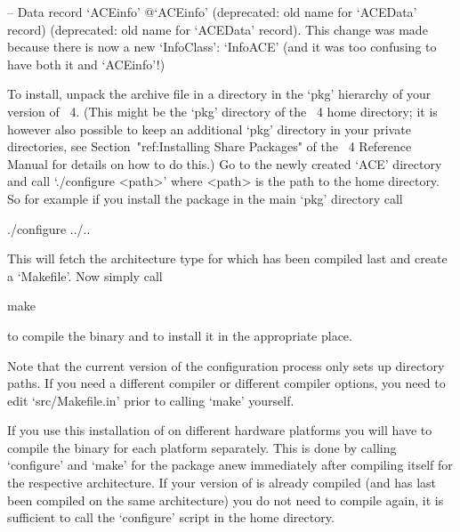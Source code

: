 \item{--} Data      record      `ACEinfo'{\undoquotes{}
{@`ACEinfo' (deprecated: old name for `ACEData' record)}} (deprecated:
old name for `ACEData' record). This change was made because there  is
now a new `InfoClass': `InfoACE' (and it was  too  confusing  to  have
both it and `ACEinfo'!)

\endlist



To  install, unpack  the  archive file  in  a directory  in the  `pkg'
hierarchy  of your  version  of  {\GAP}~4. (This  might  be the  `pkg'
directory of the {\GAP}~4 home  directory; it is however also possible
to keep an additional `pkg' directory in your private directories, see
Section~"ref:Installing  Share Packages"  of  the {\GAP}~4   Reference
Manual for details  on how to do this.) Go to  the newly created `ACE'
directory and  call `./configure <path>'  where <path> is the  path to
the {\GAP} home  directory. So for example if  you install the package
in the main `pkg' directory call

\begintt
./configure ../..
\endtt

This  will fetch  the  architecture  type for  which  {\GAP} has  been
compiled last and create a `Makefile'. Now simply call

\begintt
make
\endtt

to compile the binary and to install it in the appropriate place.

Note that the  current version of the configuration  process only sets
up  directory paths.  If you  need a  different compiler  or different
compiler options, you need  to edit `src/Makefile.in' prior to calling
`make' yourself.

If you use this installation of {\GAP} on different hardware platforms
you will have to compile the binary for each platform separately. This
is  done  by calling  `configure'  and  `make'  for the  package  anew
immediately   after  compiling  {\GAP}   itself  for   the  respective
architecture.  If your version of  {\GAP} is already compiled (and has
last  been compiled  on  the same  architecture)  you do  not need  to
compile {\GAP} again, it is  sufficient to call the `configure' script
in the {\GAP} home directory.

